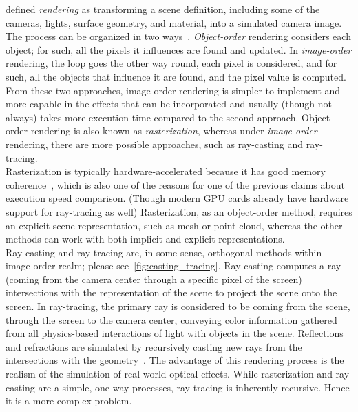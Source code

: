 \citet{SOTARendering} defined \emph{rendering} as transforming a scene definition, including some of the cameras,
lights, surface geometry, and material, into a simulated camera image. The process can be organized in two
ways~\citep{marschner2021fundamentals}. \emph{Object-order} rendering considers each object; for such,
all the pixels it influences are found and updated. In \emph{image-order} rendering, the loop
goes the other way round, each pixel is considered, and for such, all the objects that influence it are found, and
the pixel value is computed. From these two approaches, image-order rendering is simpler to implement and more capable in the
effects that can be incorporated and usually (though not always) takes more execution time compared to the second approach.
Object-order rendering is also known as \emph{rasterization}, whereas under
\emph{image-order} rendering, there are more possible approaches, such as ray-casting and ray-tracing.\\

Rasterization is typically hardware-accelerated because it has good memory coherence~\citep{SOTARendering}, which is also
one of the reasons for one of the previous claims about execution speed comparison. (Though modern GPU cards already have
hardware support for ray-tracing as well) Rasterization,
as an object-order method, requires an explicit scene representation, such as mesh or point cloud, whereas the other
methods can work with both implicit and explicit representations.\\

Ray-casting and ray-tracing are, in some sense, orthogonal methods within image-order realm; please see~\cref{fig:casting_tracing}.
Ray-casting computes a ray (coming from the camera center
through a specific pixel of the screen) intersections with the representation of the scene to project the scene onto the screen.
In ray-tracing, the primary ray is considered to be coming from the scene, through the screen to the camera center, conveying
color information gathered from all physics-based interactions of light with objects in the scene. Reflections and refractions
are simulated by recursively casting new rays from the intersections with the geometry~\citep{Whitted1979AnII}. The advantage
of this rendering process is the realism of the simulation of real-world optical effects.
While rasterization and ray-casting are a simple, one-way
processes, ray-tracing is inherently recursive. Hence it is a more complex problem.

